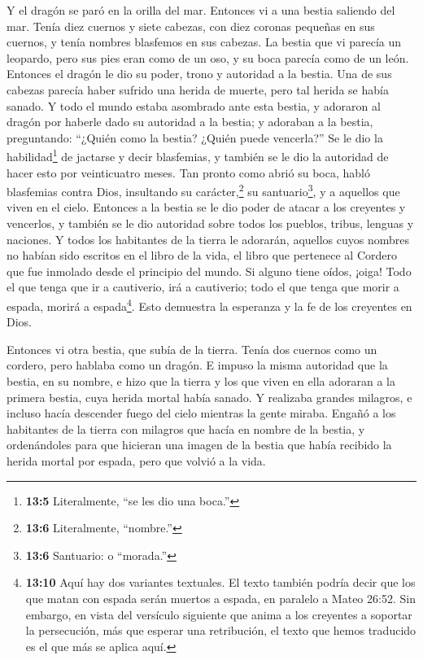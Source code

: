  Y el dragón se paró en la orilla del mar. Entonces vi a una
bestia saliendo del mar. Tenía diez cuernos y siete cabezas, con diez
coronas pequeñas en sus cuernos, y tenía nombres blasfemos en sus
cabezas.  La bestia que vi parecía un leopardo, pero sus
pies eran como de un oso, y su boca parecía como de un león. Entonces el
dragón le dio su poder, trono y autoridad a la bestia.  Una
de sus cabezas parecía haber sufrido una herida de muerte, pero tal
herida se había sanado. Y todo el mundo estaba asombrado ante esta
bestia,  y adoraron al dragón por haberle dado su autoridad
a la bestia; y adoraban a la bestia, preguntando: ``¿Quién como la
bestia? ¿Quién puede vencerla?''  Se le dio la
habilidad\footnote{\textbf{13:5} Literalmente, ``se les dio una boca.''}
de jactarse y decir blasfemias, y también se le dio la autoridad de
hacer esto por veinticuatro meses.  Tan pronto como abrió su
boca, habló blasfemias contra Dios, insultando su carácter,\footnote{\textbf{13:6}
  Literalmente, ``nombre.''} su santuario\footnote{\textbf{13:6}
  Santuario: o ``morada.''}, y a aquellos que viven en el cielo.
 Entonces a la bestia se le dio poder de atacar a los
creyentes y vencerlos, y también se le dio autoridad sobre todos los
pueblos, tribus, lenguas y naciones.  Y todos los habitantes
de la tierra le adorarán, aquellos cuyos nombres no habían sido escritos
en el libro de la vida, el libro que pertenece al Cordero que fue
inmolado desde el principio del mundo.  Si alguno tiene
oídos, ¡oiga!  Todo el que tenga que ir a cautiverio, irá a
cautiverio; todo el que tenga que morir a espada, morirá a
espada\footnote{\textbf{13:10} Aquí hay dos variantes textuales. El
  texto también podría decir que los que matan con espada serán muertos
  a espada, en paralelo a Mateo 26:52. Sin embargo, en vista del
  versículo siguiente que anima a los creyentes a soportar la
  persecución, más que esperar una retribución, el texto que hemos
  traducido es el que más se aplica aquí.}. Esto demuestra la esperanza
y la fe de los creyentes en Dios.

 Entonces vi otra bestia, que subía de la tierra. Tenía dos
cuernos como un cordero, pero hablaba como un dragón.  E
impuso la misma autoridad que la bestia, en su nombre, e hizo que la
tierra y los que viven en ella adoraran a la primera bestia, cuya herida
mortal había sanado.  Y realizaba grandes milagros, e
incluso hacía descender fuego del cielo mientras la gente miraba.
 Engañó a los habitantes de la tierra con milagros que
hacía en nombre de la bestia, y ordenándoles para que hicieran una
imagen de la bestia que había recibido la herida mortal por espada, pero
que volvió a la vida.


